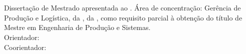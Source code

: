 \begin{center}
    {\singlespacing
    \MakeUppercase{\textbf{\aluno}} \\ [5cm]

    \MakeUppercase{\titulo} \\ [1cm]
    
    \hspace{.45\textwidth} %
        \begin{minipage}{.5\textwidth}
        \noindent Dissertação de Mestrado apresentada ao \curso. Área de concentração: Gerência de Produção e Logística, da \departamento, da \universidade, como requisito parcial à obtenção do título de Mestre em Engenharia de Produção e Sistemas. \\ [5mm]
        \noindent Orientador: \orientador \\
        \noindent Coorientador: \coorientador
        \end{minipage}
    
    \vfill
    
    \MakeUppercase{\cidade} \\ 
    \ano}
\end{center}